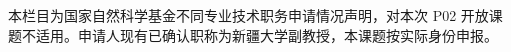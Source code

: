 \justifying
\NSFCBodyText

本栏目为国家自然科学基金不同专业技术职务申请情况声明，对本次 P02 开放课题不适用。申请人现有已确认职称为新疆大学副教授，本课题按实际身份申报。
